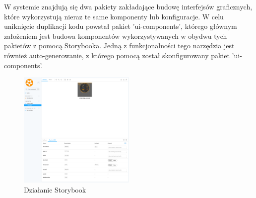 W systemie znajdują się dwa pakiety zakładające budowę interfejsów graficznych, które wykorzystują nieraz te same komponenty lub konfiguracje. W celu uniknięcie duplikacji kodu powstał pakiet 'ui-components', którego głównym założeniem jest budowa komponentów wykorzystywanych w obydwu tych pakietów z pomocą Storybooka. Jedną z funkcjonalności tego narzędzia jest również auto-generowanie, z którego pomocą został skonfigurowany pakiet 'ui-components'. 

\begin{figure}[h!]
    \centering
    \includegraphics[width=0.5\textwidth]{images/ui-components/storybook.png}
    \caption{Działanie Storybook}
    \label{fig:storybook}
\end{figure}
